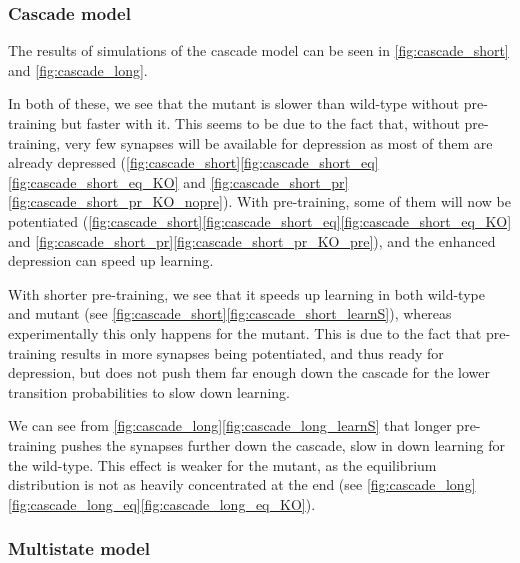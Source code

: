 \documentclass[12pt]{article}
\begin{document}
\subsubsection{Cascade model}\label{sec:cascade}





The results of simulations of the cascade model can be seen in \autoref{fig:cascade_short} and \autoref{fig:cascade_long}.

In both of these, we see that the mutant is slower than wild-type without pre-training but faster with it.
This seems to be due to the fact that, without pre-training, very few synapses will be available for depression as most of them are already depressed (\autoref{fig:cascade_short}\ref{fig:cascade_short_eq}\ref{fig:cascade_short_eq_KO} and \ref{fig:cascade_short_pr}\ref{fig:cascade_short_pr_KO_nopre}).
With pre-training, some of them will now be potentiated (\autoref{fig:cascade_short}\ref{fig:cascade_short_eq}\ref{fig:cascade_short_eq_KO} and \ref{fig:cascade_short_pr}\ref{fig:cascade_short_pr_KO_pre}), and the enhanced depression can speed up learning.

With shorter pre-training, we see that it speeds up learning in both wild-type and mutant (see \autoref{fig:cascade_short}\ref{fig:cascade_short_learnS}), whereas experimentally this only happens for the mutant.
This is due to the fact that pre-training results in more synapses being potentiated, and thus ready for depression, but does not push them far enough down the cascade for the lower transition probabilities to slow down learning.

We can see from \autoref{fig:cascade_long}\ref{fig:cascade_long_learnS} that longer pre-training pushes the synapses further down the cascade, slow in down learning for the wild-type.
This effect is weaker for the mutant, as the equilibrium distribution is not as heavily concentrated at the end (see \autoref{fig:cascade_long}\ref{fig:cascade_long_eq}\ref{fig:cascade_long_eq_KO}).


\subsubsection{Multistate model}\label{sec:multistate}
\end{document}
